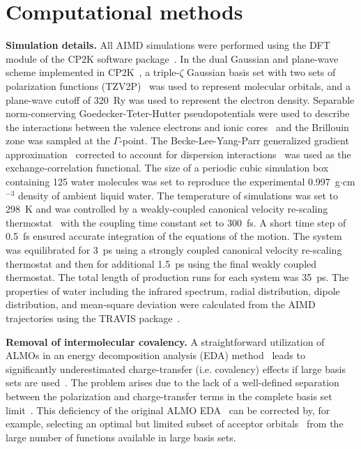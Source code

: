 \documentclass[journal=jacsat,manuscript=article]{achemso}
\begin{document}
\section{Computational methods}

\textbf{Simulation details.} All AIMD simulations were performed using the DFT module of the CP2K software package~\cite{www:cp2k}. 
In the dual Gaussian and plane-wave scheme implemented in CP2K~\cite{hutter2014cp2k}, a triple-$\zeta$ Gaussian basis set with two sets of polarization functions (TZV2P)~\cite{vandevondele2007gaussian} was used to represent molecular orbitals, and a plane-wave cutoff of 320~Ry was used to represent the electron density. 
Separable norm-conserving Goedecker-Teter-Hutter pseudopotentials were used to describe the interactions between the valence electrons and ionic cores~\cite{goedecker1996separable,krack2005pseudopotentials} and the Brillouin zone was sampled at the $\Gamma$-point. 
The Becke-Lee-Yang-Parr generalized gradient approximation~\cite{becke1988density, lee1988development} corrected to account for dispersion interactions~\cite{grimme2010consistent} was used as the exchange-correlation functional. 
The size of a periodic cubic simulation box containing 125 water molecules was set to reproduce the experimental 0.997~g$\cdot$cm$^{-3}$ density of ambient liquid water. 
The temperature of simulations was set to 298~K and was controlled by a weakly-coupled canonical velocity re-scaling thermostat~\cite{bussi2007canonical} with the coupling time constant set to 300~fs. 
A short time step of 0.5~fs ensured accurate integration of the equations of the motion. 
The system was equilibrated for 3~ps using a strongly coupled canonical velocity re-scaling thermostat and then for additional 1.5~ps using the final weakly coupled thermostat. 
The total length of production runs for each system was 35~ps. 
The properties of water including the infrared spectrum, radial distribution, dipole distribution, and mean-square deviation were calculated from the AIMD trajectories using the TRAVIS package~\cite{brehm2012travis}.  

\textbf{Removal of intermolecular covalency.} A straightforward utilization of ALMOs in an energy decomposition analysis (EDA) method~\cite{khaliullin2007unravelling} leads to significantly underestimated charge-transfer (i.e. covalency) effects if large basis sets are used~\cite{horn2015polarization,lao2016energy}. 
The problem arises due to the lack of a well-defined separation between the polarization and charge-transfer terms in the complete basis set limit~\cite{misquitta2013charge,horn2015polarization}. 
This deficiency of the original ALMO EDA~\cite{khaliullin2007unravelling} can be corrected by, for example, selecting an optimal but limited subset of acceptor orbitals~\cite{horn2015polarization} from the large number of functions available in large basis sets. 
\end{document}
